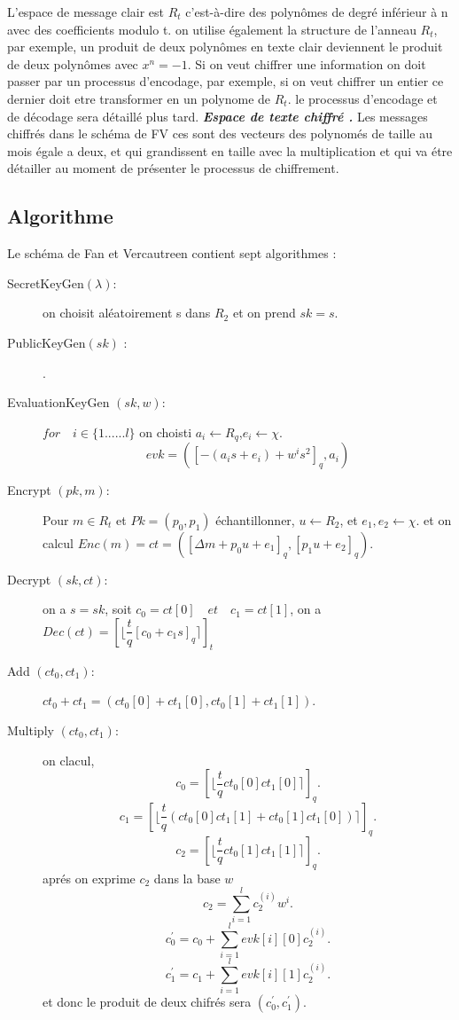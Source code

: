 \documentclass[a4paper,12pt]{report}
\begin{document}
L'espace de message clair est $R_t$ c'est-à-dire des polynômes de degré inférieur à n avec des coefficients modulo t. on utilise également la structure de l'anneau $R_t$, par exemple, un produit de deux polynômes en texte clair deviennent le produit de deux polynômes avec $x^n = -1$.\newline
Si on veut chiffrer une information on doit passer par un processus d'encodage, par exemple, si on veut chiffrer un entier ce dernier doit etre transformer en un polynome de $R_t$. le processus d'encodage et de décodage sera détaillé plus tard.\newline 
\textbf{\textit{ Espace de texte chiffré .}}\newline
Les messages chiffrés dans le schéma de FV ces sont des vecteurs  des polynomés de taille au mois égale a deux, et qui grandissent en taille avec la multiplication et qui va étre détailler au moment de présenter le processus de chiffrement. 
\subsection*{Algorithme}
Le schéma de Fan et Vercautreen contient sept algorithmes : \newline
 \begin{description}
 \item[SecretKeyGen$(\lambda)$:]  on choisit aléatoirement s dans $R_2$ et on prend $sk=s$.
 \item[PublicKeyGen$(sk)$ :] .
 \item[EvaluationKeyGen $(sk, w)$:] $for\quad i\in \{1......l\}$ on choisti $a_i\xleftarrow{}{}R_q$,$e_i\xleftarrow{}{}\chi.$\newline
 $$evk = ([-(a_is+e_i)+w^is^2]_q, a_i)$$
 \item[Encrypt $(pk, m)$:] Pour $m \in R_t$ et $Pk = (p_0, p_1)$ échantillonner, $u\xleftarrow{}{} {R_2}$, et $e_1,e_2 \xleftarrow{}{} \chi$.
 \newline et on calcul $Enc(m) = ct = ([\Delta m + p_0 u + e_1]_q, [p_1 u + e_2]_q).$
 \item[Decrypt $(sk, ct)$:] on a $s = sk $, soit $c_0 = ct[0]\quad et\quad c_1 = ct[1]$, on a $Dec(ct) = [\lfloor\dfrac{t}{q}[c_0 + c_1 s]_q\rceil]_t$
 \item[Add  $(ct_0, ct_1)$:]  $ct_0 + ct_1 = (ct_0[0] + ct_1[0], ct_0[1] + ct_1[1])$.
 \item[Multiply $(ct_0, ct_1)$:] on clacul, \newline
 $$c_0 = [\lfloor\dfrac{t}{q}ct_0[0]ct_1[0]\rceil]_q.$$
 $$c_1 = [\lfloor\dfrac{t}{q}(ct_0[0]ct_1[1] + ct_0[1]ct_1[0])\rceil]_q.$$
 $$c_2 = [\lfloor\dfrac{t}{q}ct_0[1]ct_1[1]\rceil]_q .$$ 
 aprés on exprime $c_2 $ dans la base $w$ $$c_2 = \sum_{i=1}^{l}c_2^{(i)}w^i.$$
 $$c_0^{'} = c_0 + \sum_{i=1}^{l}evk[i][0]c_2^{(i)} .$$
 $$c_1^{'} = c_1 + \sum_{i=1}^{l}evk[i][1]c_2^{(i)} .$$
 et donc le produit de deux chifrés sera $(c_0^{'}, c_1^{'}).$
  \end{description}
\end{document}
